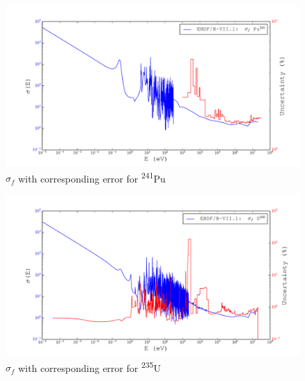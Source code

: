 \documentclass[11pt,notitlepage]{article}
\newcommand{\tss}{\textsuperscript}
\begin{document}
\begin{todolist}
    \begin{figure}[H]
    \begin{center}
      \includegraphics[width=0.9\columnwidth]{../Weighting/X_Sections/XwVar_Pu_241_94_f.pdf}
      \vspace{-5mm}
      \caption{$\sigma_f$ with corresponding error for \tss{241}Pu}
      \label{fig:XPu241}
    \end{center}
  \end{figure}

  \begin{figure}[H]
    \begin{center}
      \includegraphics[width=0.9\columnwidth]{../Weighting/X_Sections/XwVar_U_235_92_f.pdf}
      \vspace{-5mm}
      \caption{$\sigma_f$ with corresponding error for \tss{235}U}
      \label{fig:XU235}
    \end{center}
  \end{figure}


\end{todolist}
\end{document}
